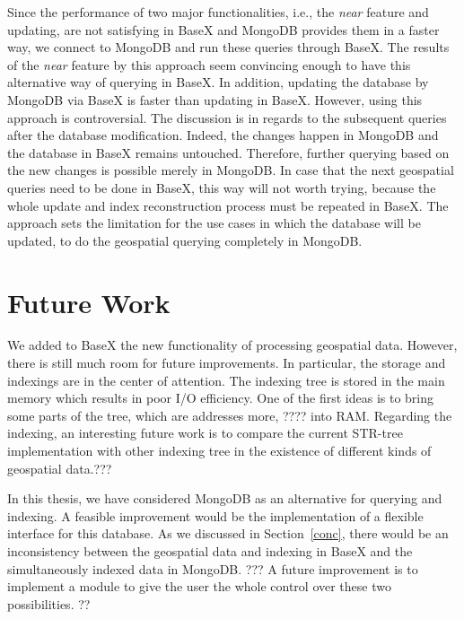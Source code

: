 \documentclass[a4paper,12pt]{article}
\begin{document}
Since the performance of two major functionalities, i.e., the \textit{near} feature and updating, are not satisfying in BaseX and MongoDB provides them in a faster way, we connect to MongoDB and run these queries through BaseX. The results of the \textit{near} feature by this approach seem convincing enough to have this alternative way of querying in BaseX. In addition, updating the database by MongoDB via BaseX is faster than updating in BaseX. However, using this approach is controversial. The discussion is in regards to the subsequent queries after the database modification. Indeed, the changes happen in MongoDB and the database in BaseX remains untouched. Therefore, further querying based on the new changes is possible merely in MongoDB. In case that the next geospatial queries need to be done in BaseX, this way will not worth trying, because the whole update and index reconstruction process must be repeated in BaseX. The approach sets the limitation for the use cases in which the database will be updated, to do the geospatial querying completely in MongoDB.


\newpage
\section{Future Work}
\label{s.future}
We added to BaseX the new functionality of processing geospatial data.
However, there is still much room for future improvements. 
In particular, the storage and indexings are in the center of attention.
The indexing tree is stored in the main memory which results in poor I/O efficiency.%
One of the first ideas is to bring some parts of the tree, which are addresses more, ????
into RAM. Regarding the indexing, an interesting future work is to compare 
the current STR-tree implementation with other indexing tree in the existence of
different kinds of geospatial data.???

In this thesis, we have considered MongoDB as an alternative for querying and indexing.
A feasible improvement would be the implementation of a flexible interface
for this database. As we discussed in Section~\ref{conc}, 
there would be an inconsistency between 
the geospatial data and indexing in BaseX and
the simultaneously indexed data in MongoDB. ??? A future improvement is to 
implement a module to give the user the whole control over these two possibilities. ??

\newpage


\newpage
\listoffigures
\newpage
\listoftables
\newpage
\lstlistoflistings
\end{document}
